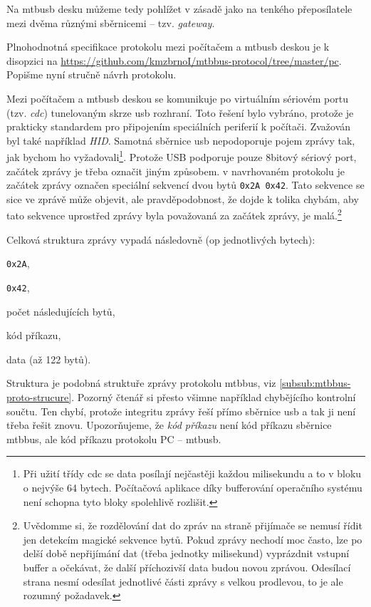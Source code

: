Na \gls{mtbusb} desku můžeme tedy pohlížet v zásadě jako na tenkého
přeposílatele mezi dvěma různými sběrnicemi – tzv. \textit{gateway}.

Plnohodnotná specifikace protokolu mezi počítačem a \gls{mtbusb} deskou je
k disopzici na \url{https://github.com/kmzbrnoI/mtbbus-protocol/tree/master/pc}.
Popišme nyní stručně návrh protokolu.

Mezi počítačem a \gls{mtbusb} deskou se komunikuje po virtuálním sériovém portu
(tzv. \textit{\gls{cdc}}) tunelovaným skrze \gls{usb} rozhraní. Toto řešení bylo vybráno,
protože je prakticky standardem pro připojením speciálních periferií k počítači.
Zvažován byl také například \textit{HID}. Samotná sběrnice \gls{usb}
nepodoporuje pojem zprávy tak, jak bychom ho vyžadovali\footnote{Při užití třídy \gls{cdc}
se data posílají nejčastěji každou milisekundu a to v bloku o nejvýše 64 bytech.
Počítačová aplikace díky bufferování operačního systému není schopna tyto bloky
spolehlivě rozlišit.}. Protože USB podporuje pouze 8bitový sériový port, začátek
zprávy je třeba označit jiným způsobem. v navrhovaném protokolu je začátek zprávy
označen speciální sekvencí dvou bytů \texttt{0x2A 0x42}. Tato sekvence se sice
ve zprávě může objevit, ale pravděpodobnost, že dojde k tolika chybám, aby
tato sekvence uprostřed zprávy byla považovaná za začátek zprávy, je
malá.\footnote{Uvědomme si, že rozdělování dat do zpráv na straně přijímače
se nemusí řídit jen detekcím magické sekvence bytů. Pokud zprávy nechodí moc
často, lze po delší době nepřijímání dat (třeba jednotky milisekund) vyprázdnit
vstupní buffer a očekávat, že další příchozivší data budou novou zprávou. Odesílací
strana nesmí odesílat jednotlivé části zprávy s velkou prodlevou, to je ale
rozumný požadavek.}

Celková struktura zprávy vypadá následovně (op jednotlivých bytech):

\begin{compactenum}
\item \texttt{0x2A},
\item \texttt{0x42},
\item počet následujících bytů,
\item kód příkazu,
\item data (až 122 bytů).
\end{compactenum}

Struktura je podobná struktuře zprávy protokolu \gls{mtbbus}, viz
\ref{subsub:mtbbus-proto-strucure}. Pozorný čtenář si přesto všimne například
chybějícího kontrolní součtu. Ten chybí, protože integritu zprávy řeší přímo
sběrnice \gls{usb} a tak ji není třeba řešit znovu. Upozorňujeme, že
\textit{kód příkazu} není kód příkazu sběrnice \gls{mtbbus}, ale kód příkazu
protokolu PC – \gls{mtbusb}.

